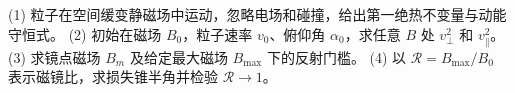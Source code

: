 (1) 粒子在空间缓变静磁场中运动，忽略电场和碰撞，给出第一绝热不变量与动能守恒式。
(2) 初始在磁场 \(B_0\)，粒子速率 \(v_0\)、俯仰角 \(\alpha_0\)，求任意 \(B\) 处 \(v_\perp^2\) 和 \(v_\parallel^2\)。
(3) 求镜点磁场 \(B_m\) 及给定最大磁场 \(B_{\max}\) 下的反射门槛。
(4) 以 \(\mathcal R=B_{\max}/B_0\) 表示磁镜比，求损失锥半角并检验 \(\mathcal R\to1\)。
